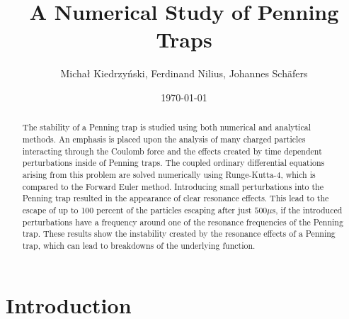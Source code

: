 \documentclass[english,notitlepage,reprint,nofootinbib]{revtex4-2}  %
\begin{document}
\title{A Numerical Study of Penning Traps}  %
\author{Michał Kiedrzyński, Ferdinand Nilius, Johannes Schäfers} %
\date{\today}                             %
\noaffiliation                            %

\begin{abstract}
    The stability of a Penning trap is studied using both numerical and analytical methods. 
    An emphasis is placed upon the analysis of many charged particles interacting through the Coulomb force and the effects created by time dependent perturbations inside of Penning traps.
    The coupled ordinary differential equations arising from this problem are solved numerically using Runge-Kutta-4, which is compared to the Forward Euler method.
    Introducing small perturbations into the Penning trap resulted in the appearance of clear resonance effects. 
    This lead to the escape of up to 100 percent of the particles escaping after just $ 500\mu \mathrm{s}$, if the introduced perturbations have a frequency around one of the resonance frequencies of the Penning trap.
    These results show the instability created by the resonance effects of a Penning trap, which can lead to breakdowns of the underlying function.
\end{abstract}
\maketitle


\section{Introduction}
\end{document}
